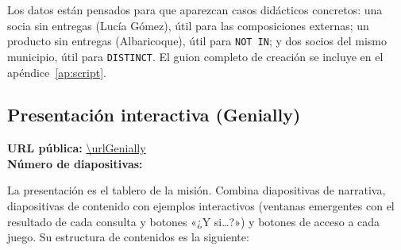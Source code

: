 \documentclass[11pt,a4paper]{article}
\begin{document}
Los datos están pensados para que aparezcan casos didácticos concretos: una socia sin
entregas (Lucía Gómez), útil para las composiciones externas; un producto sin entregas
(Albaricoque), útil para \texttt{NOT IN}; y dos socios del mismo municipio, útil para
\texttt{DISTINCT}. El guion completo de creación se incluye en el
apéndice~\ref{ap:script}.

\subsection{Presentación interactiva (Genially)}

\begin{nota}
\textbf{URL pública:} \url{\urlGenially}\\
\textbf{Número de diapositivas:} \numDiapositivas
\end{nota}

La presentación es el tablero de la misión. Combina diapositivas de narrativa,
diapositivas de contenido con ejemplos interactivos (ventanas emergentes con el resultado de
cada consulta y botones «¿Y si…?») y botones de acceso a cada juego. Su estructura de
contenidos es la siguiente:
\end{document}
